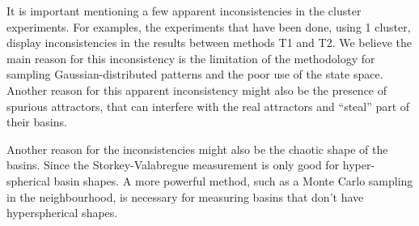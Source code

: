 It is important mentioning a few apparent inconsistencies in the cluster experiments. For examples, the experiments that have been done, using 1 cluster, display inconsistencies in the results between methods T1 and T2. We believe the main reason for this inconsistency is the limitation of the methodology for sampling Gaussian-distributed patterns and the poor use of the state space. Another reason for this apparent inconsistency might also be the presence of spurious attractors, that can interfere with the real attractors and ``steal'' part of their basins.

Another reason for the inconsistencies might also be the chaotic shape of the basins. Since the Storkey-Valabregue measurement is only good for hyper-spherical basin shapes. A more powerful method, such as a Monte Carlo sampling in the neighbourhood, is necessary for measuring basins that don't have hyperspherical shapes.